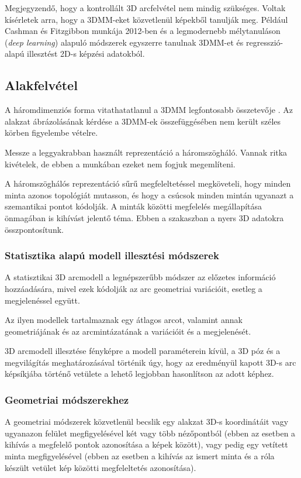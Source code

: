 \documentclass[12pt,a4]{article}
\begin{document}
	 Megjegyzendő, hogy a kontrollált 3D arcfelvétel nem mindig szükséges. Voltak kísérletek arra, hogy a 3DMM-eket közvetlenül képekből tanulják meg. Például Cashman és Fitzgibbon munkája 2012-ben \cite{dolphins} és a legmodernebb mélytanuláson (\textit{deep learning}) alapuló módszerek egyszerre tanulnak 3DMM-et és regresszió-alapú illesztést 2D-s képzési adatokból.
	 
	 \subsection{Alakfelvétel}
	 A háromdimenziós forma vitathatatlanul a 3DMM legfontosabb összetevője \cite{3dmm}. Az alakzat ábrázolásának kérdése
	 a 3DMM-ek összefüggésében nem került széles körben figyelembe vételre.
	 
	  Messze a
	 leggyakrabban használt reprezentáció a háromszögháló. Vannak ritka kivételek, de ebben a munkában ezeket nem fogjuk megemlíteni.
	 
	  A háromszöghálós reprezentáció sűrű megfeleltetéssel megköveteli, hogy minden minta azonos topológiát mutasson, és hogy a csúcsok minden mintán ugyanazt a szemantikai pontot kódolják. A minták közötti megfelelés megállapítása önmagában is kihívást jelentő téma. Ebben a szakaszban a nyers 3D adatokra összpontosítunk.
	
	
	\subsubsection{Statisztika alapú modell illesztési módszerek}
	A statisztikai 3D arcmodell \cite{survey} a legnépszerűbb módszer az előzetes információ hozzáadására, mivel ezek kódolják az arc geometriai variációit, esetleg a megjelenéssel együtt.
	
	 Az ilyen modellek tartalmaznak egy átlagos arcot, valamint annak geometriájának és az arcmintázatának a variációit és a megjelenését.
	 
	  3D arcmodell illesztése fényképre
	a modell paraméterein kívül,
	a 3D póz és a megvilágítás meghatározásával történik úgy, hogy
	az eredményül kapott 3D-s arc képsíkjába történő vetülete
	a lehető legjobban hasonlítson az adott képhez.
	
	\subsubsection{Geometriai módszerekhez}
	A geometriai módszerek \cite{3dmm} közvetlenül becslik egy alakzat 3D-s koordinátáit vagy ugyanazon felület megfigyelésével
	két vagy több nézőpontból (ebben az esetben a kihívás a megfelelő pontok azonosítása a képek között), vagy pedig egy vetített minta megfigyelésével (ebben az esetben a kihívás az ismert minta és a róla készült vetület kép közötti megfeleltetés azonosítása).
	
\end{document}
